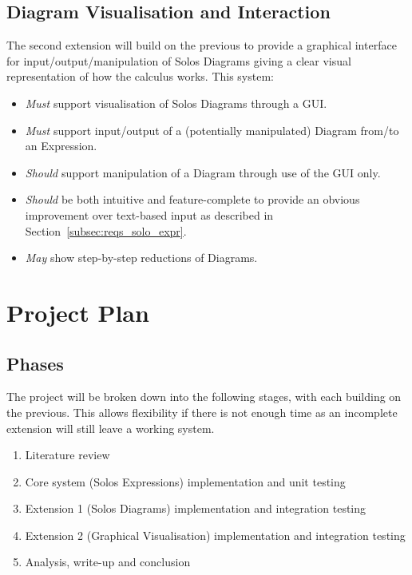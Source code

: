 \documentclass{article}
\begin{document}
\subsection{Diagram Visualisation and Interaction}
The second extension will build on the previous to provide a graphical interface for input/output/manipulation of Solos Diagrams giving a clear visual representation of how the calculus works.
This system:
\begin{itemize}
	\item \textit{Must} support visualisation of Solos Diagrams through a GUI\@.
	\item \textit{Must} support input/output of a (potentially manipulated) Diagram from/to an Expression.
	\item \textit{Should} support manipulation of a Diagram through use of the GUI only.
	\item \textit{Should} be both intuitive and feature-complete to provide an obvious improvement over text-based input as described in Section~\ref{subsec:reqs_solo_expr}.
	\item \textit{May} show step-by-step reductions of Diagrams.
\end{itemize}


\section{Project Plan}
\subsection{Phases}
The project will be broken down into the following stages, with each building on the previous. This allows flexibility if there is not enough time as an incomplete extension will still leave a working system.
\begin{enumerate}
	\item Literature review
	\item Core system (Solos Expressions) implementation and unit testing
	\item Extension 1 (Solos Diagrams) implementation and integration testing
	\item Extension 2 (Graphical Visualisation) implementation and integration testing
	\item Analysis, write-up and conclusion
\end{enumerate}
\end{document}
